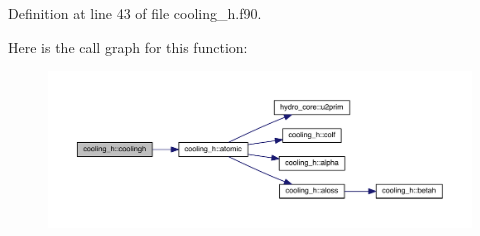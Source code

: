 Definition at line 43 of file cooling\+\_\+h.\+f90.



Here is the call graph for this function\+:\nopagebreak
\begin{figure}[H]
\begin{center}
\leavevmode
\includegraphics[width=350pt]{namespacecooling__h_ad092ffe4588667ec0c7360154f3ca7ff_cgraph}
\end{center}
\end{figure}


